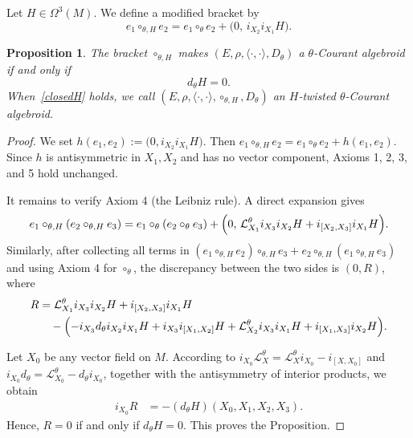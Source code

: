 \documentclass[11pt,a4paper]{article}
\theoremstyle{plain}
\newtheorem{proposition}[theorem]{Proposition}
\theoremstyle{definition}
\theoremstyle{remark}
\begin{document}
Let $H\in\Omega^3(M)$. We define a modified bracket by
\begin{equation*}
	e_1 \circ_{\theta,H} e_2
	=
	e_1 \circ_\theta e_2 + \bigl(0,\, i_{X_2} i_{X_1} H\bigr).
\end{equation*}

\begin{proposition}
	The bracket $\circ_{\theta,H}$ makes $(E,\rho,\langle\cdot,\cdot\rangle,D_\theta)$ a $\theta$-Courant algebroid
	if and only if
	\begin{equation}\label{closedH}
		d_{\theta} H = 0.
	\end{equation}
	When~\eqref{closedH} holds, we call $(E,\rho,\langle\cdot,\cdot\rangle,\circ_{\theta,H},D_\theta)$ an
	\emph{$H$-twisted $\theta$-Courant algebroid}.
\end{proposition}

\begin{proof}
	We set $h(e_1,e_2):=\bigl(0, i_{X_2} i_{X_1} H\bigr)$. Then
	$e_1\circ_{\theta,H}e_2 = e_1\circ_\theta e_2 + h(e_1,e_2)$.
	Since $h$ is antisymmetric in $X_1,X_2$ and has no vector component, Axioms 1, 2, 3, and 5
	hold unchanged.
	
	It remains to verify Axiom 4 (the Leibniz rule). A direct expansion gives
	$$
	e_1\circ_{\theta,H}(e_2\circ_{\theta,H}e_3)
	=
	e_1\circ_\theta(e_2\circ_\theta e_3)
	+
	\Bigl(0,\,\mathcal{L}^\theta_{X_1} i_{X_3} i_{X_2} H + i_{[X_2,X_3]} i_{X_1} H\Bigr).
	$$
	Similarly, after collecting all terms in
	$(e_1\circ_{\theta,H}e_2)\circ_{\theta,H}e_3 + e_2\circ_{\theta,H}(e_1\circ_{\theta,H}e_3)$
	and using Axiom 4 for $\circ_\theta$, the discrepancy between the two sides is
	$(0,R)$, where
	\begin{align*}
		R
		&=
		\mathcal{L}^\theta_{X_1} i_{X_3}i_{X_2}H + i_{[X_2,X_3]} i_{X_1} H \\
		&\quad
		-\Bigl(
		-i_{X_3}d_{\theta} i_{X_2}i_{X_1}H
		+ i_{X_3} i_{[X_1,X_2]} H
		+ \mathcal{L}^\theta_{X_2} i_{X_3}i_{X_1}H
		+ i_{[X_1,X_3]} i_{X_2} H
		\Bigr).
	\end{align*}
	
	Let $X_0$ be any vector field on $M$. According to
	$i_{X_0}\mathcal{L}^\theta_X = \mathcal{L}^\theta_X i_{X_0} - i_{[X,X_0]}$
	and
	$i_{X_0}d_{\theta} = \mathcal{L}^\theta_{X_0}-d_{\theta} i_{X_0}$,
	together with the antisymmetry of interior products, we obtain
	\begin{align*}
		i_{X_0}R &= -(d_{\theta} H)(X_0,X_1,X_2,X_3).
	\end{align*}
	Hence, $R=0$ if and only if $d_{\theta} H=0$. This proves the Proposition.
\end{proof}
\end{document}
